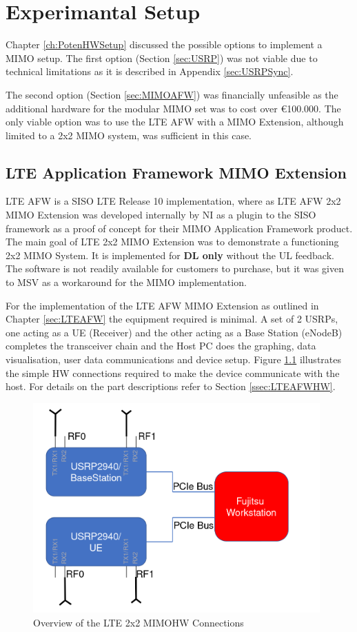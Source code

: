 \chapter{Experimantal Setup}
\label{ch:ExSetup}

Chapter \ref{ch:PotenHWSetup} discussed the possible options to implement a MIMO setup. The first option (Section \ref{sec:USRP}) was not viable due to technical limitations as it is described in Appendix \ref{sec:USRPSync}.

The second option (Section \ref{sec:MIMOAFW}) was financially unfeasible as the additional hardware for the modular MIMO set was to cost over €100.000. The only viable option was to use the LTE AFW with a MIMO Extension, although limited to a 2x2 MIMO system, was sufficient in this case.

\section{LTE Application Framework MIMO Extension}\label{sec:LTEAFWMIMOExt}

LTE AFW is a SISO LTE Release 10 implementation, where as LTE AFW 2x2 MIMO Extension was developed internally by NI as a plugin to the SISO framework as a proof of concept for their MIMO Application Framework product. The main goal of LTE 2x2 MIMO Extension was to demonstrate a functioning 2x2 MIMO System. It is implemented for \textbf{DL only} without the UL feedback. The software is not readily available for customers to purchase, but it was given to MSV as a workaround for the MIMO implementation.

For the implementation of the LTE AFW MIMO Extension as outlined in Chapter \ref{sec:LTEAFW} the equipment required is minimal. A set of 2 USRPs, one acting as a UE (Receiver) and the other acting as a Base Station (eNodeB) completes the transceiver chain and the Host PC does the graphing, data visualisation, user data communications and device setup. Figure \ref{fig:LTEAFWHWSetup} illustrates the simple HW connections required to make the device communicate with the host. For details on the part descriptions refer to Section \ref{ssec:LTEAFWHW}.

\begin{figure}[!htb]
    \centering
    \includegraphics[width=11cm]{images/MIMOSetUpArrangement.png}
    \caption{Overview of the LTE 2x2 MIMOHW Connections}
    \label{fig:LTEAFWHWSetup}
\end{figure}


